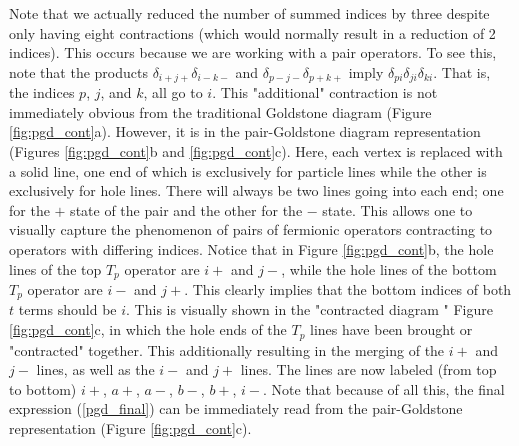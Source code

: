 \documentclass[10pt]{article}
\begin{document}
Note that we actually reduced the number of summed indices by three despite only having eight contractions (which would normally result in a reduction of 2 indices). This occurs because we are working with a pair operators. To see this, note that the products $\delta_{i+j+}\delta_{i-k-}$ and $\delta_{p-j-}\delta_{p+k+}$ imply $\delta_{pi}\delta_{ji}\delta_{ki}$. That is, the indices $p$, $j$, and $k$, all go to $i$. This "additional" contraction is not immediately obvious from the traditional Goldstone diagram (Figure \ref{fig:pgd_cont}a). However, it is in the pair-Goldstone diagram representation (Figures \ref{fig:pgd_cont}b and \ref{fig:pgd_cont}c). Here, each vertex is replaced with a solid line, one end of which is exclusively for particle lines while the other is exclusively for hole lines. There will always be two lines going into each end; one for the $+$ state of the pair and the other for the $-$ state. This allows one to visually capture the phenomenon of pairs of fermionic operators contracting to operators with differing indices. Notice that in Figure \ref{fig:pgd_cont}b, the hole lines of the top $T_p$ operator are $i+$ and $j-$, while the hole lines of the bottom $T_p$ operator are $i-$ and $j+$. This clearly implies that the bottom indices of both $t$ terms should be $i$. This is visually shown in the "contracted diagram " Figure \ref{fig:pgd_cont}c, in which the hole ends of the $T_p$ lines have been brought or "contracted" together. This additionally resulting in the merging of the $i+$ and $j-$ lines, as well as the $i-$ and $j+$ lines. The lines are now labeled (from top to bottom) $i+$, $a+$, $a-$, $b-$, $b+$, $i-$. Note that because of all this, the final expression (\ref{pgd_final}) can be immediately read from the pair-Goldstone representation (Figure \ref{fig:pgd_cont}c).
\end{document}
